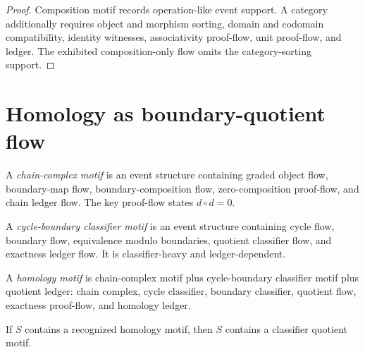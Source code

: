 \begin{proof}
Composition motif records operation-like event support. A category additionally requires object and morphism sorting, domain and codomain compatibility, identity witnesses, associativity proof-flow, unit proof-flow, and ledger. The exhibited composition-only flow omits the category-sorting support.
\end{proof}

\section{Homology as boundary-quotient flow}
\label{sec:higher-case-homology}

\begin{definition}
\label{def:higher-case-chain-complex-motif}
A \emph{chain-complex motif} is an event structure containing graded object flow, boundary-map flow, boundary-composition flow, zero-composition proof-flow, and chain ledger flow. The key proof-flow states $d\circ d=0$.
\end{definition}

\begin{definition}
\label{def:higher-case-cycle-boundary-classifier}
A \emph{cycle-boundary classifier motif} is an event structure containing cycle flow, boundary flow, equivalence modulo boundaries, quotient classifier flow, and exactness ledger flow. It is classifier-heavy and ledger-dependent.
\end{definition}

\begin{definition}
\label{def:higher-case-homology-motif}
A \emph{homology motif} is chain-complex motif plus cycle-boundary classifier motif plus quotient ledger: chain complex, cycle classifier, boundary classifier, quotient flow, exactness proof-flow, and homology ledger.
\end{definition}

\begin{proposition}
\label{prop:higher-case-homology-has-compression}
If $S$ contains a recognized homology motif, then $S$ contains a classifier quotient motif.
\end{proposition}


